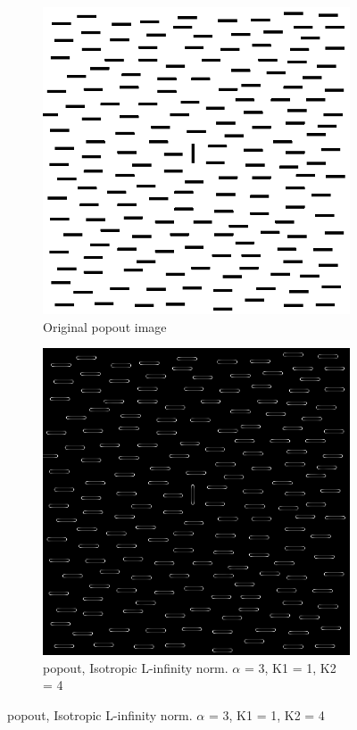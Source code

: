 \begin{figure}[H]
  \centering
	\begin{subfigure}{.7\textwidth}
    \centering
    \includegraphics[width=.9\textwidth]{./canny/popout}
    \caption{Original popout image}
    \label{fig:popout}
  \end{subfigure}%
  
    \begin{subfigure}{.7\textwidth}
    \centering
    \includegraphics[width=.9\textwidth]{./canny/popout_LINF_a3_k11_k24}
    \caption{popout, Isotropic L-infinity norm. $\alpha$ = 3, K1 = 1, K2 = 4}
    \label{fig:popout_LINF_a3_k11_k24}
  \end{subfigure}%

\end{figure}

